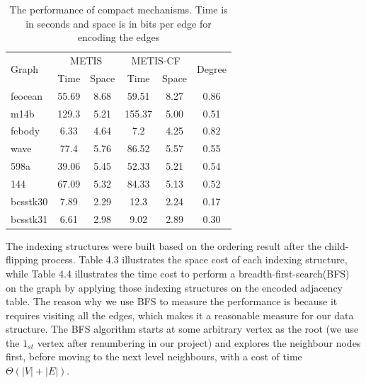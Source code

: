 \documentclass[12pt,glossary]{dalthesis}
\begin{document}
\begin{table}[]
\centering
\caption{The performance of compact mechanisms. Time is in seconds and space is in bits per edge for encoding the edges}
\label{compact-performance}
\begin{tabular}{|l||c|c||c|c||c|}
\cline{2-6}
\hline
\multirow{2}{*}{Graph} & \multicolumn{2}{c||}{METIS} & \multicolumn{2}{c||}{METIS-CF} & \multirow{2}{*}{Degree} \\ \cline{2-5}
                       & Time          & Space        & Time           & Space         &                         \\ \cline{6-6} \hline
feocean                & 55.69         & 8.68         & 59.51          & 8.27          & 0.86                    \\
m14b                   & 129.3         & 5.21         & 155.37         & 5.00          & 0.51                    \\
febody                 & 6.33          & 4.64         & 7.2            & 4.25          & 0.82                    \\
wave                   & 77.4          & 5.76         & 86.52          & 5.57          & 0.55                    \\
598a                   & 39.06         & 5.45         & 52.33          & 5.21          & 0.54                    \\
144                    & 67.09         & 5.32         & 84.33          & 5.13          & 0.52                    \\
bcsstk30               & 7.89          & 2.29         & 12.3           & 2.24          & 0.17                    \\
bcsstk31               & 6.61          & 2.98         & 9.02           & 2.89          & 0.30                    \\ \hline
\end{tabular}
\end{table}

\bigskip
The indexing structures were built based on the ordering result after the child-flipping process. Table 4.3 illustrates the space cost of each indexing structure, while Table 4.4 illustrates the time cost to perform a breadth-first-search(BFS) on the graph by applying those indexing structures on the encoded adjacency table. The reason why we use BFS to measure the performance is because it requires visiting all the edges, which makes it a reasonable measure for our data structure. The BFS algorithm starts at some arbitrary vertex as the root (we use the $1_{st}$ vertex after renumbering in our project) and explores the neighbour nodes first, before moving to the next level neighbours, with a cost of time $\Theta(|V| + |E|)$. 
\end{document}
